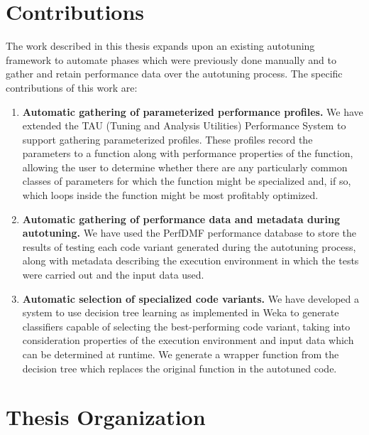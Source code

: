 \documentclass[msthesis,justified,copyright,final,numbers,sort&compress,
gsmodern,amstex,natbib]{uothesis}
\begin{document}
\section{Contributions}

The work described in this thesis expands upon an existing autotuning framework \cite{full,framework,shreyas,nek5000} to automate phases which were previously done manually and to gather and retain performance data over the autotuning process. The specific contributions of this work are:

\begin{enumerate}
\item \textbf{Automatic gathering of parameterized performance profiles.} We have extended the TAU (Tuning and Analysis Utilities) Performance System \cite{tau} to support gathering parameterized profiles. These profiles record the parameters to a function along with performance properties of the function, allowing the user to determine whether there are any particularly common classes of parameters for which the function might be specialized and, if so, which loops inside the function might be most profitably optimized.

\item \textbf{Automatic gathering of performance data and metadata during autotuning.} We have used the PerfDMF performance database \cite{perfdmf,perfexplorer,datamining} to store the results of testing each code variant generated during the autotuning process, along with metadata describing the execution environment in which the tests were carried out and the input data used.

\item \textbf{Automatic selection of specialized code variants.} We have developed a system to use decision tree learning \cite{id3,c45} as implemented in Weka \cite{weka} to generate classifiers capable of selecting the best-performing code variant, taking into consideration properties of the execution environment and input data which can be determined at runtime. We generate a wrapper function from the decision tree which replaces the original function in the autotuned code.
\end{enumerate}

\section{Thesis Organization}
\end{document}
